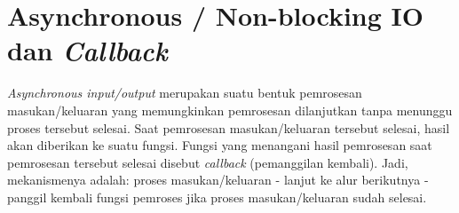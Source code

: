 \lstset{language=JavaScript,caption=server.js}


\lstset{language=JavaScript,caption=server-on-error.js}


\section{Asynchronous / Non-blocking IO dan \textit{Callback}}

\textit{Asynchronous input/output} merupakan suatu bentuk pemrosesan masukan/keluaran yang memungkinkan pemrosesan dilanjutkan tanpa menunggu proses tersebut selesai. Saat pemrosesan masukan/keluaran tersebut selesai, hasil akan diberikan ke suatu fungsi. Fungsi yang menangani hasil pemrosesan saat pemrosesan tersebut selesai disebut \textit{callback} (pemanggilan kembali). Jadi, mekanismenya adalah: proses masukan/keluaran - lanjut ke alur berikutnya - panggil kembali fungsi pemroses jika proses masukan/keluaran sudah selesai.

\lstset{language=JavaScript,caption=Membaca file secara synchronous}


\lstset{language=JavaScript,caption=Membaca file secara asynchronous}

